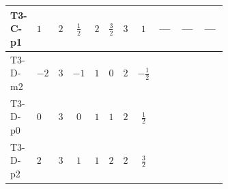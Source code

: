 \documentclass[8pt]{article}
\begin{document}
\begin{landscape}
\begin{longtable}{@{}llcccccc >{\raggedright\arraybackslash}p{0.21\linewidth} >{\raggedright\arraybackslash}p{0.21\linewidth} >{\raggedright\arraybackslash}p{0.21\linewidth}@{}}
\midrule
T3-C-p1 & $1$ & $2$ & $\frac{1}{2}$ & $2$ & $\frac{3}{2}$ & $3$ & $1$ & --- & --- & --- \\
\midrule
T3-D-m2 & $-2$ & $3$ & $-1$ & $1$ & $0$ & $2$ & $-\frac{1}{2}$ & \scriptsize\adjustbox{max width=\linewidth}{$\begin{gathered} {\lambda_{S_1}^{(1)}} \left(\frac{1}{2} T_{\nu}^{(1)}+13 {\lambda_{S_1}^{(A)}}\right)\end{gathered}$} & \scriptsize\adjustbox{max width=\linewidth}{$\begin{gathered} +4 {\lambda_{S_1}^{(A)}} T_{\nu}^{(1)}\end{gathered}$} & \scriptsize\adjustbox{max width=\linewidth}{$\begin{gathered} -\operatorname{Tr}\!\left({y_1}\,\left({y_1}\right)^{\dagger}\,{y_1}\,\left({y_1}\right)^{\dagger}\right)\end{gathered}$} \\
\midrule
T3-D-p0 & $0$ & $3$ & $0$ & $1$ & $1$ & $2$ & $\frac{1}{2}$ & \scriptsize\adjustbox{max width=\linewidth}{$\begin{gathered} {\lambda_{S_1}^{(1)}} \left(\frac{1}{2} T_{\nu}^{(1)}+13 {\lambda_{S_1}^{(A)}}\right)\end{gathered}$} & \scriptsize\adjustbox{max width=\linewidth}{$\begin{gathered} +4 {\lambda_{S_1}^{(A)}} T_{\nu}^{(1)}\end{gathered}$} & \scriptsize\adjustbox{max width=\linewidth}{$\begin{gathered} -\operatorname{Tr}\!\left({y_1}\,\left({y_1}\right)^{\dagger}\,{y_1}\,\left({y_1}\right)^{\dagger}\right)\end{gathered}$} \\
\midrule
T3-D-p2 & $2$ & $3$ & $1$ & $1$ & $2$ & $2$ & $\frac{3}{2}$ & \scriptsize\adjustbox{max width=\linewidth}{$\begin{gathered} {\lambda_{S_1}^{(1)}} \left(\frac{1}{2} T_{\nu}^{(1)}+13 {\lambda_{S_1}^{(A)}}\right)\end{gathered}$} & \scriptsize\adjustbox{max width=\linewidth}{$\begin{gathered} +4 {\lambda_{S_1}^{(A)}} T_{\nu}^{(1)}\end{gathered}$} & \scriptsize\adjustbox{max width=\linewidth}{$\begin{gathered} -\operatorname{Tr}\!\left({y_1}\,\left({y_1}\right)^{\dagger}\,{y_1}\,\left({y_1}\right)^{\dagger}\right)\end{gathered}$} \\

\end{longtable}
\end{landscape}
\end{document}

